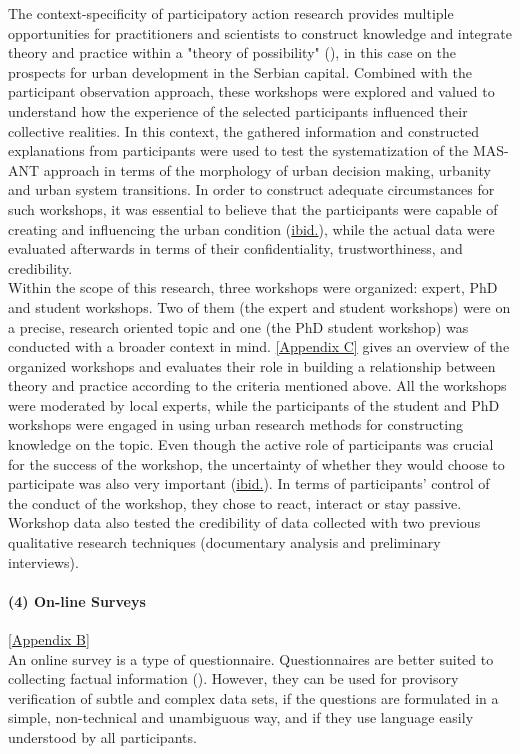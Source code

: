 \documentclass[11pt]{report}
\begin{document}
The context-specificity of participatory action research provides multiple opportunities for practitioners and scientists to construct knowledge and integrate theory  and  practice within a "theory of possibility" (\href{Mc}{\citealt{whyte_participatory_1991}}), in this case on the prospects for urban development in the Serbian capital. Combined with the participant observation approach, these workshops were explored and valued to understand how the experience of the selected participants influenced their collective realities. In this context, the gathered information and constructed explanations from participants were used to test the systematization of the MAS-ANT approach in terms of the morphology of urban decision making, urbanity and urban system transitions. In order to construct adequate circumstances for such workshops, it was essential to believe that the participants were capable of creating and influencing the urban condition (\href{Mc}{ibid.}), while the actual data were evaluated afterwards in terms of their confidentiality, trustworthiness, and credibility.
\\

Within the scope of this research, three workshops were organized: expert, PhD and student workshops. Two of them (the expert and student workshops) were on a precise, research oriented topic and one (the PhD student workshop) was conducted with a broader context in mind.
\href{Appendix C}{[Appendix C]} gives an overview of the organized workshops and evaluates their role in building a relationship between theory and practice according to the criteria mentioned above. All the workshops were moderated by local experts, while the participants of the student and PhD workshops were engaged in using urban research methods for constructing knowledge on the topic. Even though the active role of participants was crucial for the success of the workshop, the uncertainty of whether they would choose to participate was also very important (\href{Mc}{ibid.}).
In terms of participants’ control of the conduct of the workshop, they chose to react, interact or stay passive. Workshop data also tested the credibility of data collected with two previous qualitative research techniques (documentary analysis and preliminary interviews).

\paragraph{(4) On-line Surveys}
[\href{ref}{Appendix B}]
\\
An online survey is a type of questionnaire. Questionnaires are better suited to collecting factual information (\href{ref}{\citealt{payne_key_2004}}). However, they can be used for provisory verification of subtle and complex data sets, if the questions are formulated in a simple, non-technical and unambiguous way, and if they use  language easily understood by all participants.
\\
\end{document}
